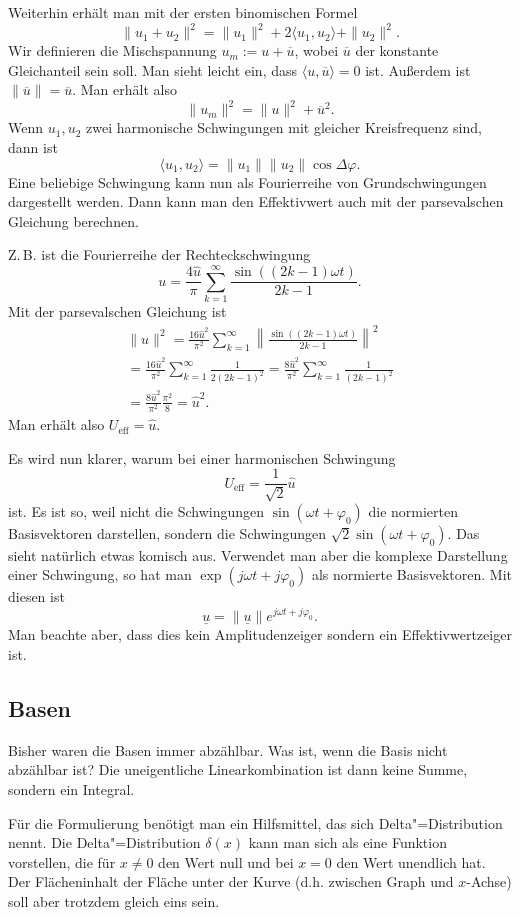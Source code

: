 \documentclass[a4paper,10pt,fleqn,twocolumn,twoside]{article}
\begin{document}
Weiterhin erhält man mit der ersten binomischen Formel
\[\|u_1+u_2\|^2 = \|u_1\|^2+2\langle u_1,u_2\rangle+\|u_2\|^2.\]
Wir definieren die Mischspannung $u_m := u+\overline u$,
wobei $\overline u$ der konstante Gleichanteil sein soll. Man sieht
leicht ein, dass $\langle u,\overline u\rangle=0$ ist.
Außerdem ist $\|\overline u\|=\overline u$. Man erhält also
\[\|u_m\|^2 = \|u\|^2+\overline u^2.\]
Wenn $u_1,u_2$ zwei harmonische Schwingungen mit gleicher
Kreisfrequenz sind, dann ist
\[\langle u_1,u_2\rangle = \|u_1\|\|u_2\|\cos\Delta\varphi.\]
Eine beliebige Schwingung kann nun als Fourierreihe von
Grundschwingungen dargestellt werden. Dann kann man den Effektivwert
auch mit der parsevalschen Gleichung berechnen.

Z.\,B. ist die Fourierreihe der Rechteckschwingung
\[u = \frac{4\hat u}{\pi} \sum_{k=1}^{\infty}
\frac{\sin((2k-1)\omega t)}{2k-1}.\]
Mit der parsevalschen Gleichung ist
\begin{gather*}
\|u\|^2 = \frac{16\hat u^2}{\pi^2} \sum_{k=1}^{\infty}
\left\|\frac{\sin((2k-1)\omega t)}{2k-1}\right\|^2\\
= \frac{16\hat u^2}{\pi^2} \sum_{k=1}^{\infty} \frac{1}{2(2k-1)^2}
= \frac{8\hat u^2}{\pi^2} \sum_{k=1}^{\infty} \frac{1}{(2k-1)^2}\\
= \frac{8\hat u^2}{\pi^2} \frac{\pi^2}{8} = \hat u^2.
\end{gather*}
Man erhält also $U_\mathrm{eff}=\hat u$.

Es wird nun klarer, warum bei einer harmonischen Schwingung
\[U_\mathrm{eff}=\frac{1}{\sqrt{2}}\hat u\]
ist. Es ist so, weil nicht die Schwingungen
$\sin(\omega t+\varphi_0)$ die normierten Basisvektoren darstellen,
sondern die Schwingungen $\sqrt{2}\sin(\omega t+\varphi_0)$. Das
sieht natürlich etwas komisch aus. Verwendet man aber die komplexe
Darstellung einer Schwingung, so hat man
$\exp(j\omega t+j\varphi_0)$ als normierte Basisvektoren.
Mit diesen ist
\[\underline u = \|\underline u\|e^{j\omega t+j\varphi_0}.\]
Man beachte aber, dass dies kein Amplitudenzeiger sondern ein
Effektivwertzeiger ist.

\subsection{Basen}

Bisher waren die Basen immer abzählbar. Was ist, wenn die Basis nicht
abzählbar ist? Die uneigentliche Linearkombination ist dann keine
Summe, sondern ein Integral.

Für die Formulierung benötigt man ein Hilfsmittel, das sich
Delta"=Distribution nennt. Die Delta"=Distribution $\delta(x)$ kann man
sich als eine Funktion vorstellen, die für $x\ne 0$ den Wert null
und bei $x=0$ den Wert unendlich hat. Der Flächeninhalt der Fläche
unter der Kurve (d.h. zwischen Graph und $x$-Achse) soll aber
trotzdem gleich eins sein.
\end{document}

